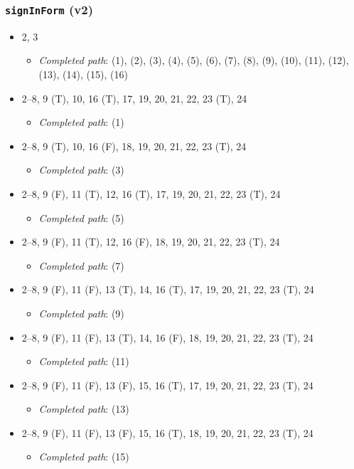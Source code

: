 \documentclass{article}
\newcommand{\completedpath}{\textit{Completed path}}
\begin{document}
\subsubsection*{\texttt{signInForm} (v2)}

\begin{itemize}
    \item 2, 3
          \begin{itemize}
              \item \completedpath: (1), (2), (3), (4), (5), (6), (7), (8), (9), (10), (11), (12), (13), (14), (15), (16)
          \end{itemize}
    \item 2--8, 9 (T), 10, 16 (T), 17, 19, 20, 21, 22, 23 (T), 24
          \begin{itemize}
              \item \completedpath: (1)
          \end{itemize}
    \item 2--8, 9 (T), 10, 16 (F), 18, 19, 20, 21, 22, 23 (T), 24
          \begin{itemize}
              \item \completedpath: (3)
          \end{itemize}
    \item 2--8, 9 (F), 11 (T), 12, 16 (T), 17, 19, 20, 21, 22, 23 (T), 24
          \begin{itemize}
              \item \completedpath: (5)
          \end{itemize}
    \item 2--8, 9 (F), 11 (T), 12, 16 (F), 18, 19, 20, 21, 22, 23 (T), 24
          \begin{itemize}
              \item \completedpath: (7)
          \end{itemize}
    \item 2--8, 9 (F), 11 (F), 13 (T), 14, 16 (T), 17, 19, 20, 21, 22, 23 (T), 24
          \begin{itemize}
              \item \completedpath: (9)
          \end{itemize}
    \item 2--8, 9 (F), 11 (F), 13 (T), 14, 16 (F), 18, 19, 20, 21, 22, 23 (T), 24
          \begin{itemize}
              \item \completedpath: (11)
          \end{itemize}
    \item 2--8, 9 (F), 11 (F), 13 (F), 15, 16 (T), 17, 19, 20, 21, 22, 23 (T), 24
          \begin{itemize}
              \item \completedpath: (13)
          \end{itemize}
    \item 2--8, 9 (F), 11 (F), 13 (F), 15, 16 (T), 18, 19, 20, 21, 22, 23 (T), 24
          \begin{itemize}
              \item \completedpath: (15)
          \end{itemize}
\end{itemize}
\end{document}
